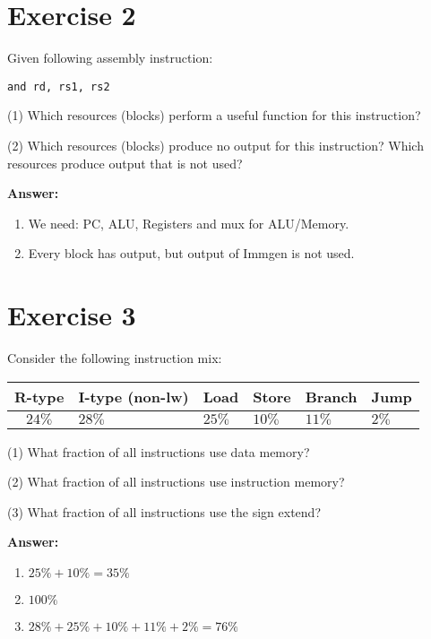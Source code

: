 \documentclass[11pt,a4paper]{article}
\begin{document}
\section*{Exercise 2}
Given following assembly instruction: 

\verb|and rd, rs1, rs2|

(1) Which resources (blocks) perform a useful function for this instruction? 

(2) Which resources (blocks) produce no output for this instruction? Which resources produce output that is not used? 


\vspace{0.3cm}

\textbf{Answer:}

\begin{enumerate}[(1)]
    \item We need: PC, ALU, Registers and mux for ALU/Memory.
    \item Every block has output, but output of Immgen is not used.
\end{enumerate}

\section*{Exercise 3}

Consider the following instruction mix:

\begin{tabular}{|c|l|l|l|l|l|}

\hline R-type & I-type (non-lw) & Load & Store & Branch & Jump \\

\hline $24 \%$ & $28 \%$ & $25 \%$ & $10 \%$ & $11 \%$ & $2 \%$ \\

\hline

\end{tabular}

(1) What fraction of all instructions use data memory?

(2) What fraction of all instructions use instruction memory?

(3) What fraction of all instructions use the sign extend?

\vspace{0.3cm}

\textbf{Answer:}

\begin{enumerate}[(1)]
    \item $25 \%+10 \%=35 \%$
    \item $100 \%$
    \item $28 \%+25 \%+10 \%+11 \%+2 \%=76 \%$
\end{enumerate}
\end{document}
